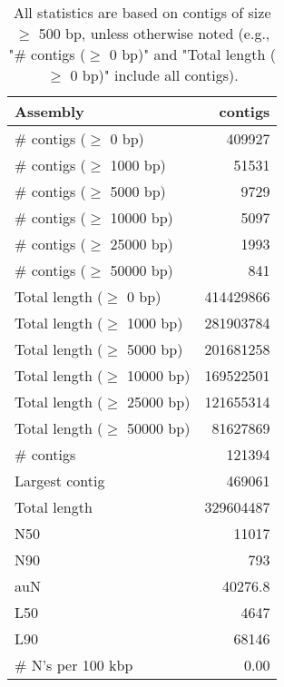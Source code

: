 \documentclass[12pt,a4paper]{article}
\begin{document}
\begin{table}[ht]
\begin{center}
\caption{All statistics are based on contigs of size $\geq$ 500 bp, unless otherwise noted (e.g., "\# contigs ($\geq$ 0 bp)" and "Total length ($\geq$ 0 bp)" include all contigs).}
\begin{tabular}{|l*{1}{|r}|}
\hline
Assembly & contigs \\ \hline
\# contigs ($\geq$ 0 bp) & 409927 \\ \hline
\# contigs ($\geq$ 1000 bp) & 51531 \\ \hline
\# contigs ($\geq$ 5000 bp) & 9729 \\ \hline
\# contigs ($\geq$ 10000 bp) & 5097 \\ \hline
\# contigs ($\geq$ 25000 bp) & 1993 \\ \hline
\# contigs ($\geq$ 50000 bp) & 841 \\ \hline
Total length ($\geq$ 0 bp) & 414429866 \\ \hline
Total length ($\geq$ 1000 bp) & 281903784 \\ \hline
Total length ($\geq$ 5000 bp) & 201681258 \\ \hline
Total length ($\geq$ 10000 bp) & 169522501 \\ \hline
Total length ($\geq$ 25000 bp) & 121655314 \\ \hline
Total length ($\geq$ 50000 bp) & 81627869 \\ \hline
\# contigs & 121394 \\ \hline
Largest contig & 469061 \\ \hline
Total length & 329604487 \\ \hline
N50 & 11017 \\ \hline
N90 & 793 \\ \hline
auN & 40276.8 \\ \hline
L50 & 4647 \\ \hline
L90 & 68146 \\ \hline
\# N's per 100 kbp & 0.00 \\ \hline
\end{tabular}
\end{center}
\end{table}
\end{document}
